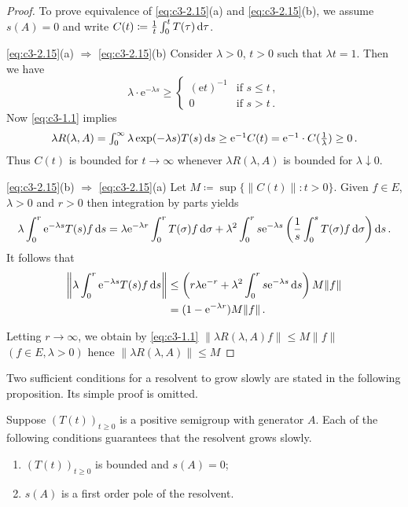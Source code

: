 \begin{proof} 
To prove equivalence of \eqref{eq:c3-2.15}(a) and \eqref{eq:c3-2.15}(b), we assume $s(A) = 0$ and write $C(t) \coloneqq \frac{1}{t} \int_{0}^{t} T(\tau) \mathop{}\!\mathrm{d}{\tau}$.

\eqref{eq:c3-2.15}(a) $\Rightarrow$ \eqref{eq:c3-2.15}(b)\quad 
Consider $\lambda > 0$, $t > 0$ such that $\lambda t = 1$. 
Then we have
\[
\lambda \cdot \mathrm{e}^{-\lambda s} \geq 
\begin{cases}
	(\mathrm{e}t)^{-1} & \text{if } s \leq t\,, \\
	0 & \text{if } s > t\,.
\end{cases}
\]
Now \eqref{eq:c3-1.1} implies 
\[\textstyle
\lambda R(\lambda,A) = \int_{0}^{\infty} \lambda \exp(-\lambda s)T(s) \mathop{}\!\mathrm{d}{s} \geq \mathrm{e}^{-1}C(t) = \mathrm{e}^{-1}\cdot C(\frac{1}{\lambda}) \geq 0\,.
\]
Thus $C(t)$ is bounded for $t \to \infty$ whenever $\lambda R(\lambda,A)$ is bounded for $\lambda \downarrow 0$.

\eqref{eq:c3-2.15}(b) $\Rightarrow$ \eqref{eq:c3-2.15}(a)\quad
 Let $M \coloneqq \sup\{\|C(t)\| \colon t > 0\}$.
Given $f \in E$, $\lambda > 0$ and $r > 0$ then integration by parts yields
\[
	\lambda \int_{0}^{r} \mathrm{e}^{-\lambda s}T(s)f \mathop{}\!\mathrm{d}{s} = \lambda \mathrm{e}^{-\lambda r} \int_{0}^{r} T(\sigma)f \mathop{}\!\mathrm{d}{\sigma} + \lambda^{2}\int_{0}^{r} s\mathrm{e}^{-\lambda s}\left(\frac{1}{s}\int_{0}^{s} T(\sigma)f \mathop{}\!\mathrm{d}{\sigma}\right)\mathop{}\!\mathrm{d}{s}\,.
\]
It follows that
\begin{align*}
	\left\|\lambda \int_{0}^{r} \mathrm{e}^{-\lambda s}T(s)f \mathop{}\!\mathrm{d}{s}\right\| &\leq \left(r\lambda \mathrm{e}^{-r} + \lambda^{2}\int_{0}^{r} s\mathrm{e}^{-\lambda s} \mathop{}\!\mathrm{d}{s}\right)M\|f\| \\
	&= (1 - \mathrm{e}^{-\lambda r})M\|f\|\,.
\end{align*}

Letting $r \to \infty$, we obtain by \eqref{eq:c3-1.1} $\|\lambda R(\lambda,A)f\| \leq M\|f\|$ $(f \in E, \lambda > 0)$ hence $\|\lambda R(\lambda,A)\| \leq M$
\end{proof}
Two sufficient conditions for a resolvent to grow slowly are stated in the following proposition.
Its simple proof is omitted.
\begin{proposition}\label{prop:c3-2.9}
	Suppose $(T(t))_{t\geq 0}$ is a positive semigroup with generator $A$.
	Each of the following conditions guarantees that the resolvent grows slowly.
	\begin{enumerate}[\upshape (i)]
		\item 
		$(T(t))_{t\geq 0}$ is bounded and $s(A) = 0$;
	
		\item 
		$s(A)$ is a first order pole of the resolvent.
	\end{enumerate}
\end{proposition}
